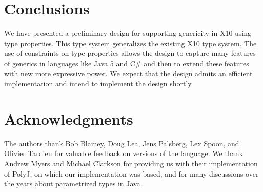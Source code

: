 \documentclass[preprint,nocopyrightspace,9pt]{sigplanconf}
\begin{document}
                        

\section{Conclusions}
\label{sec:conclusions}

We have presented a preliminary design for supporting genericity
in X10 using type properties.  This type system generalizes the
existing X10 type system.  The use of constraints on type
properties allows
the design to capture many features of generics in languages
like Java 5 and C\# and then to extend these features with new
more expressive power.
We expect that the design admits an efficient
implementation and intend to implement the design shortly.

\section*{Acknowledgments} 

The authors thank Bob Blainey, 
Doug Lea, Jens Palsberg, Lex Spoon, and Olivier Tardieu
for valuable feedback on versions of the language.
We thank 
Andrew Myers and
Michael Clarkson for providing us with their implementation of
PolyJ, on which our implementation was based, and for many
discussions over the years about parametrized types in Java.





% 
\end{document}

